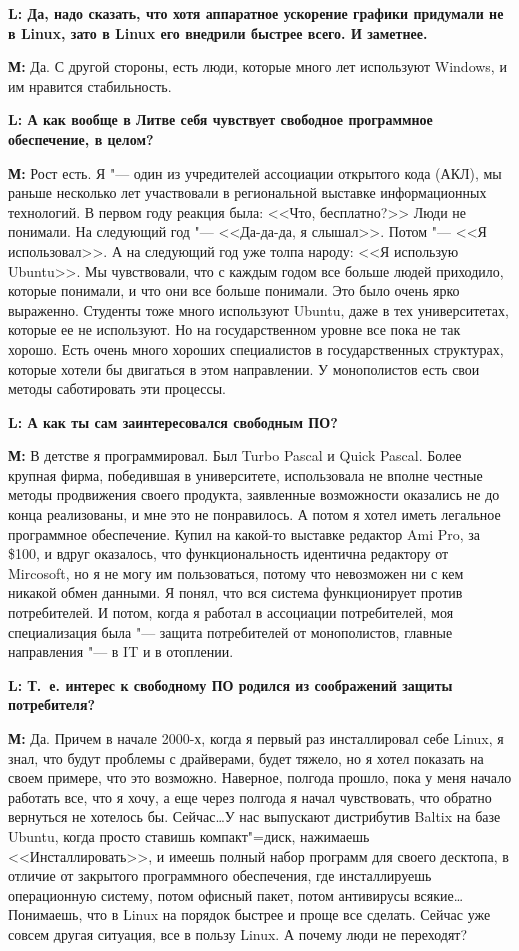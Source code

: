 \documentclass[10pt, a5paper]{article}
\begin{document}
{\noindent \bf L: Да, надо сказать, что хотя аппаратное ускорение графики придумали не в Linux, зато в Linux его внедрили быстрее всего. И заметнее. }

{\noindent \bf М:} Да. С другой стороны, есть люди, которые много лет используют Windows, и им нравится стабильность. 

{\noindent \bf L: А как вообще в Литве себя чувствует свободное программное обеспечение, в целом?}

{\noindent \bf М:} Рост есть. Я "--- один из учредителей ассоциации открытого кода (АКЛ), мы раньше несколько лет участвовали в региональной выставке информационных технологий. В первом году реакция была: <<Что, бесплатно?>> Люди не понимали. На следующий год "--- <<Да-да-да, я слышал>>. Потом "--- <<Я использовал>>. А на следующий год уже толпа народу: <<Я использую Ubuntu>>. Мы чувствовали, что с каждым годом все больше людей приходило, которые понимали, и что они все больше понимали. Это было очень ярко выраженно. Студенты тоже много используют Ubuntu, даже в тех университетах, которые ее не используют. Но на государственном уровне все пока не так хорошо. Есть очень много хороших специалистов в государственных структурах, которые хотели бы двигаться в этом направлении. У монополистов есть свои методы саботировать эти процессы.

{\noindent \bf L: А как ты сам заинтересовался свободным ПО?}

{\noindent \bf М:} В детстве я программировал. Был Turbo Pascal и  Quick Pascal. Более крупная фирма, победившая в университете, использовала не вполне честные методы продвижения своего продукта, заявленные возможности оказались не до конца реализованы, и мне это не понравилось. А потом я хотел иметь легальное программное обеспечение. Купил на какой-то выставке редактор Ami Pro, за \$100, и вдруг оказалось, что функциональность идентична редактору от Mircosoft, но я не могу им пользоваться, потому что невозможен ни с кем никакой обмен данными. Я понял, что вся система функционирует против потребителей. И потом, когда я работал в ассоциации потребителей, моя специализация была "--- защита потребителей от монополистов, главные направления "--- в IT  и в отоплении.

{\noindent \bf L: Т.~е. интерес к свободному ПО родился из соображений защиты потребителя?}

{\noindent \bf М:} Да. Причем в начале 2000-х, когда я первый раз инсталлировал себе Linux, я знал, что будут проблемы с драйверами, будет тяжело, но я хотел показать на своем примере, что это возможно. Наверное, полгода прошло, пока у меня начало работать все, что я хочу, а еще через полгода я начал чувствовать, что  обратно вернуться не хотелось бы. Сейчас\ldots У нас выпускают дистрибутив Baltix на базе Ubuntu, когда просто ставишь компакт"=диск, нажимаешь <<Инсталлировать>>, и имеешь полный набор программ для своего десктопа, в отличие от закрытого программного обеспечения, где инсталлируешь операционную систему, потом офисный пакет, потом антивирусы всякие\ldots Понимаешь, что в Linux  на порядок быстрее и проще все сделать. Сейчас уже совсем другая ситуация, все в пользу Linux. А почему люди не переходят?
\end{document}
